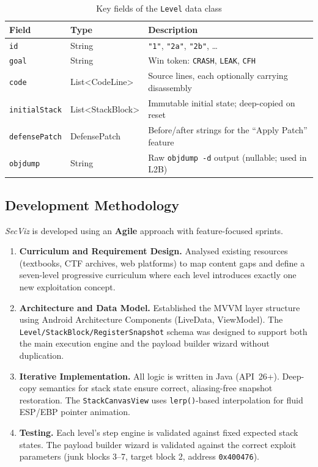 \documentclass[12pt,a4paper]{article}
\newcommand{\SV}{\textit{SecViz}}
\begin{document}
\begin{table}[H]
\centering
\caption{Key fields of the \texttt{Level} data class}
\label{tab:schema}
\renewcommand{\arraystretch}{1.25}
\begin{tabular}{p{3cm} p{2.2cm} p{7cm}}
\toprule
\textbf{Field} & \textbf{Type} & \textbf{Description} \\
\midrule
\texttt{id}            & String           & \texttt{"1"}, \texttt{"2a"}, \texttt{"2b"}, \ldots \\
\texttt{goal}          & String           & Win token: \texttt{CRASH}, \texttt{LEAK}, \texttt{CFH} \\
\texttt{code}          & List<CodeLine>   & Source lines, each optionally carrying disassembly \\
\texttt{initialStack}  & List<StackBlock> & Immutable initial state; deep-copied on reset \\
\texttt{defensePatch}  & DefensePatch     & Before/after strings for the ``Apply Patch'' feature \\
\texttt{objdump}       & String           & Raw \texttt{objdump -d} output (nullable; used in L2B) \\
\bottomrule
\end{tabular}
\end{table}

\subsection{Development Methodology}

\SV{} is developed using an \textbf{Agile} approach with feature-focused sprints.

\begin{enumerate}[leftmargin=1.5em, itemsep=4pt]
    \item \textbf{Curriculum and Requirement Design.} Analysed existing resources
    (textbooks, CTF archives, web platforms) to map content gaps and define a
    seven-level progressive curriculum where each level introduces exactly one new
    exploitation concept.

    \item \textbf{Architecture and Data Model.} Established the MVVM layer
    structure using Android Architecture Components (LiveData, ViewModel). The
    \texttt{Level/StackBlock/RegisterSnapshot} schema was designed to support both
    the main execution engine and the payload builder wizard without duplication.

    \item \textbf{Iterative Implementation.} All logic is written in Java (API~26+).
    Deep-copy semantics for stack state ensure correct, aliasing-free snapshot
    restoration. The \texttt{StackCanvasView} uses \texttt{lerp()}-based
    interpolation for fluid ESP/EBP pointer animation.

    \item \textbf{Testing.} Each level's step engine is validated against fixed
    expected stack states. The payload builder wizard is validated against the correct
    exploit parameters (junk blocks 3--7, target block 2, address \texttt{0x400476}).
\end{enumerate}
\end{document}

